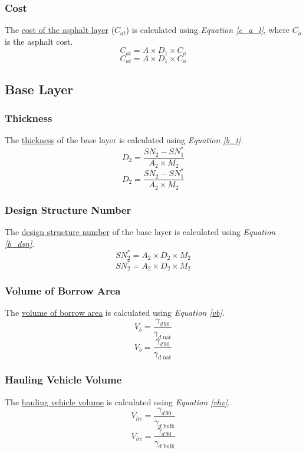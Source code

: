 \documentclass{article}
\begin{document}
\subsubsection{Cost}
\noindent The \underline{cost of the asphalt layer} ($C_{at}$) is calculated using \emph{Equation \ref{c_a_l}}, where $C_a$ is the asphalt cost.
\begin{equation}\label{c_a_l}C_{at}=A\times D_1\times C_a\end{equation}
\[C_{at}=A\times D_1\times C_a\]
\subsection{Base Layer}
\subsubsection{Thickness}
\noindent The \underline{thickness} of the base layer is calculated using \emph{Equation \ref{b_t}}.
\begin{equation}\label{b_t}D_2=\frac{SN_2-SN_1^*}{A_2\times M_2}\end{equation}
\[D_2=\frac{SN_2-SN_1^*}{A_2\times M_2}\]
\subsubsection{Design Structure Number} 
\noindent The \underline{design structure number} of the base layer is calculated using \emph{Equation \ref{b_dsn}}.
\begin{equation}\label{b_dsn}SN_2^*=A_2\times D_2\times M_2\end{equation}
\[SN_2^*=A_2\times D_2\times M_2\]
\subsubsection{Volume of Borrow Area} 
\noindent The \underline{volume of borrow area} is calculated using \emph{Equation \ref{vb}}.
\begin{equation}\label{vb}V_b=\frac{\gamma_{d\,90}}{\gamma_{d\text{ nat}}}\end{equation}
\[V_b=\frac{\gamma_{d\,90}}{\gamma_{d\text{ nat}}}\]
\subsubsection{Hauling Vehicle Volume} 
\noindent The \underline{hauling vehicle volume} is calculated using \emph{Equation \ref{vhv}}.
\begin{equation}\label{vhv}V_{hv}=\frac{\gamma_{d\,90}}{\gamma_{d\text{ bulk}}}\end{equation}
\[V_{hv}=\frac{\gamma_{d\,90}}{\gamma_{d\text{ bulk}}}\]
\end{document}
